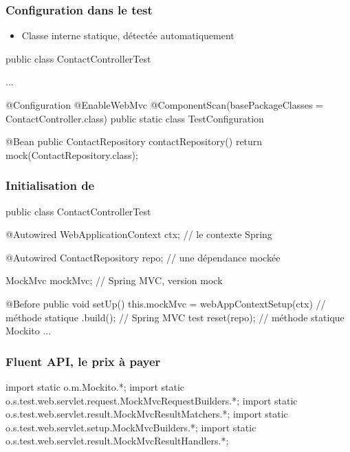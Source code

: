\begin{frame}[fragile]
 \frametitle{Configuration dans le test}
 
 \begin{itemize}
  \item Classe interne statique, détectée automatiquement
 \end{itemize}

 
 \begin{javacode}
public class ContactControllerTest {

  ...
  
  @Configuration
  @EnableWebMvc
  @ComponentScan(basePackageClasses = ContactController.class)
  public static class TestConfiguration {

      @Bean
      public ContactRepository contactRepository() {
          return mock(ContactRepository.class);
      }

  }
}
 \end{javacode}

\end{frame}

\begin{frame}[fragile]
 \frametitle{Initialisation de }
 
 \begin{javacode}
public class ContactControllerTest {

    @Autowired
    WebApplicationContext ctx; // le contexte Spring

    @Autowired ContactRepository repo; // une d\'ependance mock\'ee

    MockMvc mockMvc; // Spring MVC, version mock

    @Before public void setUp() {
        this.mockMvc = webAppContextSetup(ctx) // m\'ethode statique 
          .build();                            // Spring MVC test
        reset(repo); // m\'ethode statique Mockito
    }
    ...
}
 \end{javacode}


\end{frame}

\begin{frame}[fragile]
 \frametitle{Fluent API, le prix à payer}
 
 \begin{javacode}
import static o.m.Mockito.*;
import static o.s.test.web.servlet.request.MockMvcRequestBuilders.*;
import static o.s.test.web.servlet.result.MockMvcResultMatchers.*;
import static o.s.test.web.servlet.setup.MockMvcBuilders.*;
import static o.s.test.web.servlet.result.MockMvcResultHandlers.*;
 \end{javacode}

 
\end{frame}

